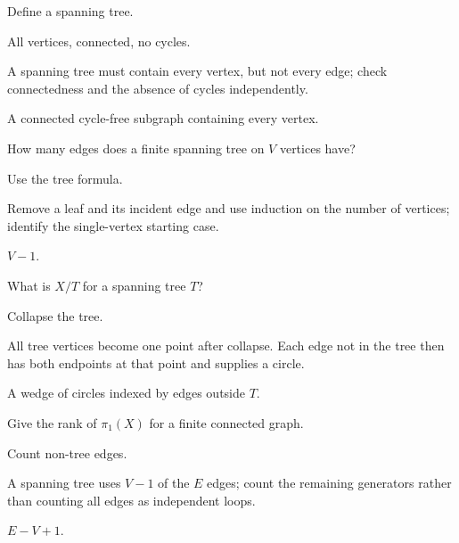 \begin{exercise}\label{exr:viii14-05}
Define a spanning tree.
\end{exercise}
\begin{hint}
All vertices, connected, no cycles.

A spanning tree must contain every vertex, but not every edge; check connectedness and the absence of cycles independently.
\end{hint}
\begin{solution}
A connected cycle-free subgraph containing every vertex.
\end{solution}

\begin{exercise}\label{exr:viii14-06}
How many edges does a finite spanning tree on \(V\) vertices have?
\end{exercise}
\begin{hint}
Use the tree formula.

Remove a leaf and its incident edge and use induction on the number of vertices; identify the single-vertex starting case.
\end{hint}
\begin{solution}
\(V-1\).
\end{solution}

\begin{exercise}\label{exr:viii14-07}
What is \(X/T\) for a spanning tree \(T\)?
\end{exercise}
\begin{hint}
Collapse the tree.

All tree vertices become one point after collapse. Each edge not in the tree then has both endpoints at that point and supplies a circle.
\end{hint}
\begin{solution}
A wedge of circles indexed by edges outside \(T\).
\end{solution}

\begin{exercise}\label{exr:viii14-08}
Give the rank of \(\pi_1(X)\) for a finite connected graph.
\end{exercise}
\begin{hint}
Count non-tree edges.

A spanning tree uses \(V-1\) of the \(E\) edges; count the remaining generators rather than counting all edges as independent loops.
\end{hint}
\begin{solution}
\(E-V+1\).
\end{solution}


